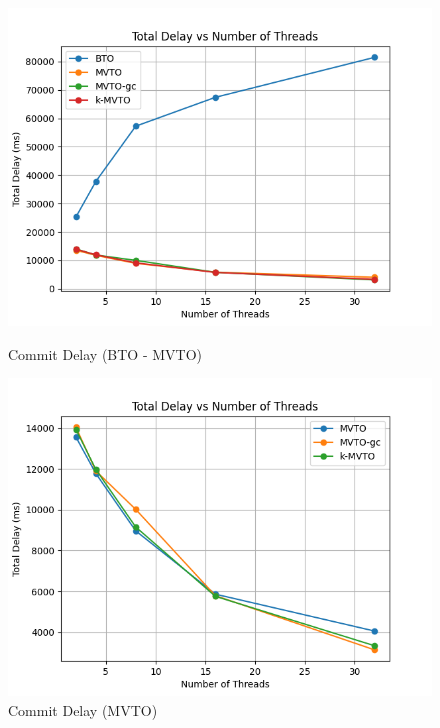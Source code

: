 \documentclass[12pt]{article}
\begin{document}
\begin{figure}[h]
    \centering
    \begin{minipage}[b]{0.45\textwidth}
        \includegraphics[width=\textwidth]{./images/ThreadsTD.png}
        \caption{Commit Delay (BTO - MVTO)}
        \label{fig:threadsTD}
    \end{minipage}
    \hfill
    \begin{minipage}[b]{0.45\textwidth}
        \includegraphics[width=\textwidth]{./images/MVTOThreadsTD.png}
        \caption{Commit Delay (MVTO)}
        \label{fig:MVTOThreadsTD}
    \end{minipage}
\end{figure}\\
\end{document}
